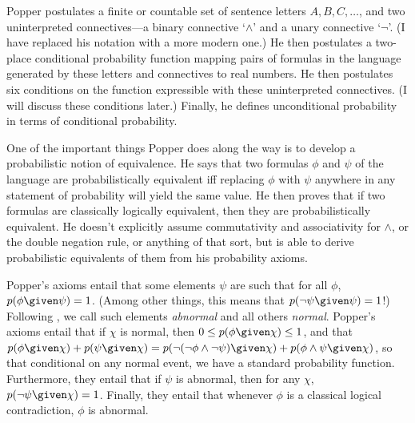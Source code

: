 Popper postulates a finite or countable set of sentence letters $A,B,C,\dots$, and two uninterpreted connectives---a binary connective `$\land$' and a unary connective `$\lnot$'. (I have replaced his notation with a more modern one.) He then postulates a two-place conditional probability function mapping pairs of formulas in the language generated by these letters and connectives to real numbers. He then postulates six conditions on the function expressible with these uninterpreted connectives. (I will discuss these conditions later.) Finally, he defines unconditional probability in terms of conditional probability.

One of the important things Popper does along the way is to develop a probabilistic notion of equivalence. He says that two formulas $\phi$ and $\psi$ of the language are probabilistically equivalent iff replacing $\phi$ with $\psi$ anywhere in any statement of probability will yield the same value. He then proves that if two formulas are classically logically equivalent, then they are probabilistically equivalent. He doesn't explicitly assume commutativity and associativity for $\land$, or the double negation rule, or anything of that sort, but is able to derive probabilistic equivalents of them from his probability axioms.

Popper's axioms entail that some elements $\psi$ are such that for all $\phi$, $p(\phi \given \psi)=1$. (Among other things, this means that $p(\lnot \psi \given \psi)=1$!) Following \citet{fraassenrep}, we call such elements \textit{abnormal} and all others \textit{normal}. Popper's axioms entail that if $\chi$ is normal, then $0\leq p(\phi \given \chi)\leq 1$, and that $p(\phi \given \chi)+p(\psi \given \chi)=p(\lnot(\lnot \phi\land\lnot \psi) \given \chi)+p(\phi\land \psi \given \chi)$, so that conditional on any normal event, we have a standard probability function. Furthermore, they entail that if $\psi$ is abnormal, then for any $\chi$, $p(\lnot \psi \given \chi)=1$. Finally, they entail that whenever $\phi$ is a classical logical contradiction, $\phi$ is abnormal.

